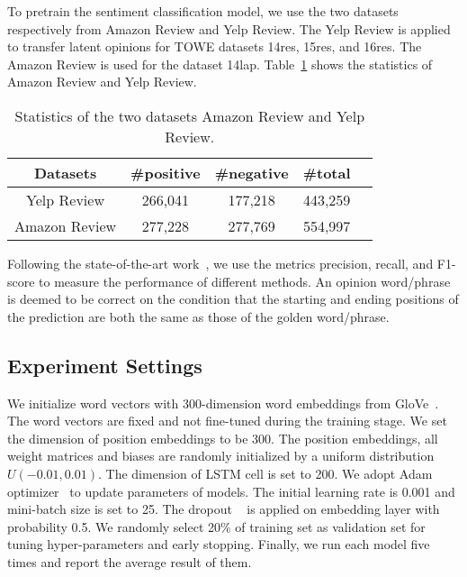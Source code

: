 \documentclass[letterpaper]{article} \usepackage{aaai20}  \usepackage{times}  \usepackage{helvet} \usepackage{courier}  \usepackage[hyphens]{url}  \usepackage{graphicx} \urlstyle{rm} \def\UrlFont{\rm}  \usepackage{graphicx}
\begin{document}
To pretrain the sentiment classification model, we use the two datasets respectively from Amazon Review and Yelp Review. The Yelp Review is applied to transfer latent opinions for TOWE datasets 14res, 15res, and 16res. The Amazon Review is used for the dataset 14lap. Table~\ref{tab:reviewdatasets} shows the statistics of Amazon Review and Yelp Review.

\begin{table}[!htp]
	\small
	\centering
	\caption{Statistics of the two datasets Amazon Review and Yelp Review.}
	\label{tab:reviewdatasets}
	\begin{tabular}{c|cccc}
		\hline
		{Datasets} & {\#positive} & {\#negative} & {\#total} \\
		\hline
		Yelp Review & 266,041 & 177,218 & 443,259 \\
		Amazon Review & 277,228 & 277,769 & 554,997 \\
		\hline
	\end{tabular}
\end{table}

Following the state-of-the-art work~\cite{DBLP:conf/naacl/FanWDHC19}, we use the metrics precision, recall, and F1-score to measure the performance of different methods. An opinion word/phrase is deemed to be correct on the condition that the starting and ending positions of the prediction are both the same as those of the golden word/phrase.

\subsection{Experiment Settings}
We initialize word vectors with 300-dimension word embeddings from GloVe~\cite{DBLP:conf/emnlp/PenningtonSM14}. The word vectors are fixed and not fine-tuned during the training stage. We set the dimension of position embeddings to be 300. The position embeddings, all weight matrices and biases are randomly initialized by a uniform distribution $U(-0.01, 0.01)$. The dimension of LSTM cell is set to 200. We adopt Adam optimizer~\cite{DBLP:journals/corr/KingmaB14} to update parameters of models. The initial learning rate is 0.001 and mini-batch size is set to 25. The dropout ~\cite{DBLP:journals/corr/abs-1207-0580} is applied on embedding layer with probability 0.5. We randomly select 20\% of training set as validation set for tuning hyper-parameters and early stopping. Finally, we run each model five times and report the average result of them.
\end{document}
